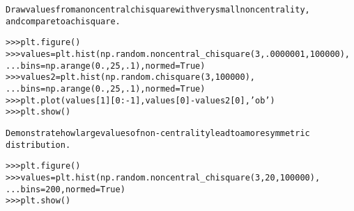 \begin{boxedminipage}{\funcwidth}
\begin{alltt}
Draw values from a noncentral chisquare with very small noncentrality,
and compare to a chisquare.

{\textgreater}{\textgreater}{\textgreater} plt.figure()
{\textgreater}{\textgreater}{\textgreater} values = plt.hist(np.random.noncentral\_chisquare(3, .0000001, 100000),
...                   bins=np.arange(0., 25, .1), normed=True)
{\textgreater}{\textgreater}{\textgreater} values2 = plt.hist(np.random.chisquare(3, 100000),
...                    bins=np.arange(0., 25, .1), normed=True)
{\textgreater}{\textgreater}{\textgreater} plt.plot(values[1][0:-1], values[0]-values2[0], 'ob')
{\textgreater}{\textgreater}{\textgreater} plt.show()

Demonstrate how large values of non-centrality lead to a more symmetric
distribution.

{\textgreater}{\textgreater}{\textgreater} plt.figure()
{\textgreater}{\textgreater}{\textgreater} values = plt.hist(np.random.noncentral\_chisquare(3, 20, 100000),
...                   bins=200, normed=True)
{\textgreater}{\textgreater}{\textgreater} plt.show()
\end{alltt}

\setlength{\parskip}{1ex}
    \end{boxedminipage}

    \label{trunk:qstkutil:bollinger:noncentral_f}

    \vspace{0.5ex}

